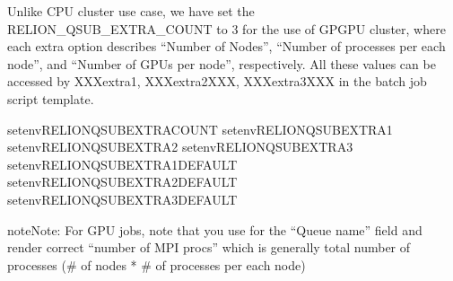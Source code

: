 \documentclass[a4paper,10pt,english]{sphinxmanual}
\begin{document}
\sphinxAtStartPar
Unlike CPU cluster use case, we have set the RELION\_QSUB\_EXTRA\_COUNT to 3 for the use of GPGPU cluster,
where each extra option describes “Number of Nodes”, “Number of processes per each node”, and “Number of GPUs per node”, respectively. All these values can be accessed by XXXextra1, XXXextra2XXX, XXXextra3XXX
in the batch job script template.

\begin{sphinxVerbatim}[commandchars=\\\{\}]
setenvRELION\PYGZus{}QSUB\PYGZus{}EXTRA\PYGZus{}COUNT
setenvRELION\PYGZus{}QSUB\PYGZus{}EXTRA1
setenvRELION\PYGZus{}QSUB\PYGZus{}EXTRA2
setenvRELION\PYGZus{}QSUB\PYGZus{}EXTRA3
setenvRELION\PYGZus{}QSUB\PYGZus{}EXTRA1\PYGZus{}DEFAULT
setenvRELION\PYGZus{}QSUB\PYGZus{}EXTRA2\PYGZus{}DEFAULT
setenvRELION\PYGZus{}QSUB\PYGZus{}EXTRA3\PYGZus{}DEFAULT
\end{sphinxVerbatim}


\begin{sphinxadmonition}{note}{Note:}
\sphinxAtStartPar
For GPU jobs, note that you  use  for the “Queue name” field and render correct “number of MPI procs” which is generally total number of processes (\# of nodes * \# of processes per each node)
\end{sphinxadmonition}
\end{document}
